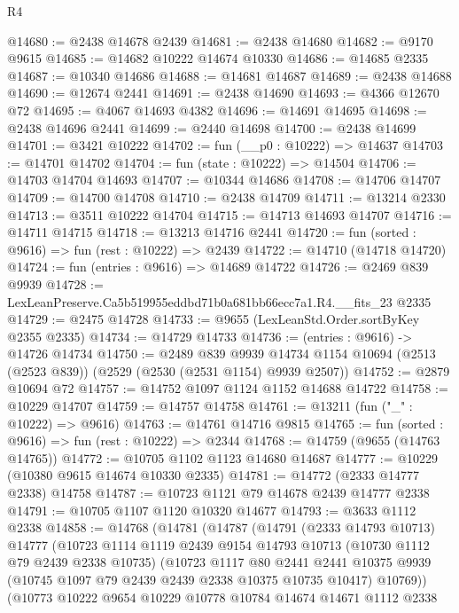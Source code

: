 \begin{lexlean}{R4}
\begin{coremodule}
@14680 := @2438 @14678 @2439
@14681 := @2438 @14680
@14682 := @9170 @9615
@14685 := @14682 @10222 @14674 @10330
@14686 := @14685 @2335
@14687 := @10340 @14686
@14688 := @14681 @14687
@14689 := @2438 @14688
@14690 := @12674 @2441
@14691 := @2438 @14690
@14693 := @4366 @12670 @72
@14695 := @4067 @14693 @4382
@14696 := @14691 @14695
@14698 := @2438 @14696 @2441
@14699 := @2440 @14698
@14700 := @2438 @14699
@14701 := @3421 @10222
@14702 := fun (__p0 : @10222) => @14637
@14703 := @14701 @14702
@14704 := fun (state : @10222) => @14504
@14706 := @14703 @14704 @14693
@14707 := @10344 @14686
@14708 := @14706 @14707
@14709 := @14700 @14708
@14710 := @2438 @14709
@14711 := @13214 @2330
@14713 := @3511 @10222 @14704
@14715 := @14713 @14693 @14707
@14716 := @14711 @14715
@14718 := @13213 @14716 @2441
@14720 := fun (sorted : @9616) => fun (rest : @10222) => @2439
@14722 := @14710 (@14718 @14720)
@14724 := fun (entries : @9616) => @14689 @14722
@14726 := @2469 @839 @9939
@14728 := LexLeanPreserve.Ca5b519955eddbd71b0a681bb66ecc7a1.R4.__fits_23 @2335
@14729 := @2475 @14728
@14733 := @9655 (LexLeanStd.Order.sortByKey @2355 @2335)
@14734 := @14729 @14733
@14736 := (entries : @9616) -> @14726 @14734
@14750 := @2489
    @839
    @9939
    @14734
    @1154
    @10694
    (@2513 (@2523 @839))
    (@2529 (@2530 (@2531 @1154) @9939 @2507))
@14752 := @2879 @10694 @72
@14757 := @14752 @1097 @1124 @1152 @14688 @14722
@14758 := @10229 @14707
@14759 := @14757 @14758
@14761 := @13211 (fun ("_" : @10222) => @9616)
@14763 := @14761 @14716 @9815
@14765 := fun (sorted : @9616) => fun (rest : @10222) => @2344
@14768 := @14759 (@9655 (@14763 @14765))
@14772 := @10705 @1102 @1123 @14680 @14687
@14777 := @10229 (@10380 @9615 @14674 @10330 @2335)
@14781 := @14772 (@2333 @14777 @2338) @14758
@14787 := @10723 @1121 @79 @14678 @2439 @14777 @2338
@14791 := @10705 @1107 @1120 @10320 @14677
@14793 := @3633 @1112 @2338
@14858 := @14768
    (@14781
      (@14787
        (@14791
          (@2333 @14793 @10713)
          @14777
          (@10723
            @1114
            @1119
            @2439
            @9154
            @14793
            @10713
            (@10730 @1112 @79 @2439 @2338 @10735)
            (@10723
              @1117
              @80
              @2441
              @2441
              @10375
              @9939
              (@10745 @1097 @79 @2439 @2439 @2338 @10375 @10735 @10417)
              @10769))
          (@10773
            @10222
            @9654
            @10229
            @10778
            @10784
            @14674
            @14671
            @1112
            @2338

\end{coremodule}
\end{lexlean}
